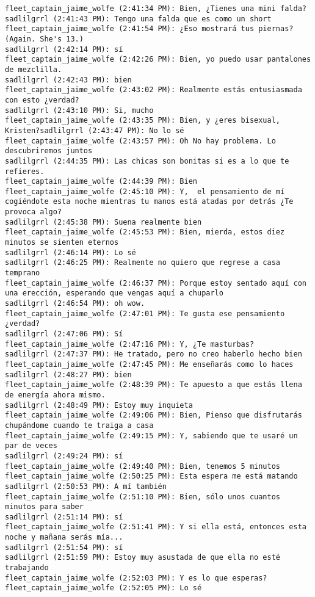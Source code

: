 \begin{verbatim}
fleet_captain_jaime_wolfe (2:41:34 PM): Bien, ¿Tienes una mini falda?
sadlilgrrl (2:41:43 PM): Tengo una falda que es como un short
fleet_captain_jaime_wolfe (2:41:54 PM): ¿Eso mostrará tus piernas? (Again. She's 13.)
sadlilgrrl (2:42:14 PM): sí
fleet_captain_jaime_wolfe (2:42:26 PM): Bien, yo puedo usar pantalones de mezclilla.
sadlilgrrl (2:42:43 PM): bien
fleet_captain_jaime_wolfe (2:43:02 PM): Realmente estás entusiasmada con esto ¿verdad?
sadlilgrrl (2:43:10 PM): Si, mucho
fleet_captain_jaime_wolfe (2:43:35 PM): Bien, y ¿eres bisexual, Kristen?sadlilgrrl (2:43:47 PM): No lo sé
fleet_captain_jaime_wolfe (2:43:57 PM): Oh No hay problema. Lo descubriremos juntos
sadlilgrrl (2:44:35 PM): Las chicas son bonitas si es a lo que te refieres.
fleet_captain_jaime_wolfe (2:44:39 PM): Bien
fleet_captain_jaime_wolfe (2:45:10 PM): Y,  el pensamiento de mí cogiéndote esta noche mientras tu manos está atadas por detrás ¿Te provoca algo?
sadlilgrrl (2:45:38 PM): Suena realmente bien
fleet_captain_jaime_wolfe (2:45:53 PM): Bien, mierda, estos diez minutos se sienten eternos
sadlilgrrl (2:46:14 PM): Lo sé
sadlilgrrl (2:46:25 PM): Realmente no quiero que regrese a casa temprano
fleet_captain_jaime_wolfe (2:46:37 PM): Porque estoy sentado aquí con una erección, esperando que vengas aquí a chuparlo
sadlilgrrl (2:46:54 PM): oh wow.
fleet_captain_jaime_wolfe (2:47:01 PM): Te gusta ese pensamiento ¿verdad?
sadlilgrrl (2:47:06 PM): Sí
fleet_captain_jaime_wolfe (2:47:16 PM): Y, ¿Te masturbas?
sadlilgrrl (2:47:37 PM): He tratado, pero no creo haberlo hecho bien
fleet_captain_jaime_wolfe (2:47:45 PM): Me enseñarás como lo haces
sadlilgrrl (2:48:27 PM): bien
fleet_captain_jaime_wolfe (2:48:39 PM): Te apuesto a que estás llena de energía ahora mismo.
sadlilgrrl (2:48:49 PM): Estoy muy inquieta
fleet_captain_jaime_wolfe (2:49:06 PM): Bien, Pienso que disfrutarás chupándome cuando te traiga a casa
fleet_captain_jaime_wolfe (2:49:15 PM): Y, sabiendo que te usaré un par de veces
sadlilgrrl (2:49:24 PM): sí
fleet_captain_jaime_wolfe (2:49:40 PM): Bien, tenemos 5 minutos
fleet_captain_jaime_wolfe (2:50:25 PM): Esta espera me está matando
sadlilgrrl (2:50:53 PM): A mí también
fleet_captain_jaime_wolfe (2:51:10 PM): Bien, sólo unos cuantos minutos para saber
sadlilgrrl (2:51:14 PM): sí
fleet_captain_jaime_wolfe (2:51:41 PM): Y si ella está, entonces esta noche y mañana serás mía...
sadlilgrrl (2:51:54 PM): sí
sadlilgrrl (2:51:59 PM): Estoy muy asustada de que ella no esté trabajando
fleet_captain_jaime_wolfe (2:52:03 PM): Y es lo que esperas?
fleet_captain_jaime_wolfe (2:52:05 PM): Lo sé

\end{verbatim}
